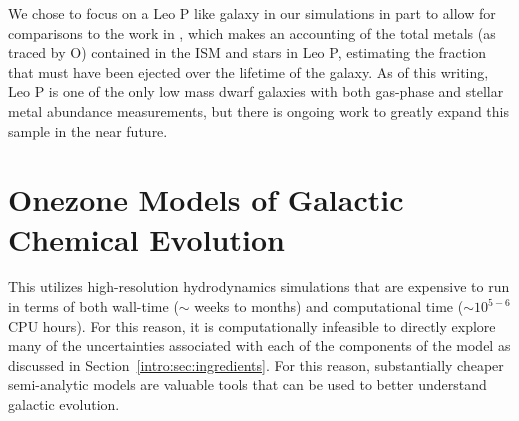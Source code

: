We chose to focus on a Leo P like galaxy in our simulations in part to allow for comparisons to the work in \cite{McQuinn2015}, which makes an accounting of the total metals (as traced by O) contained in the ISM and stars in Leo P, estimating the fraction that must have been ejected over the lifetime of the galaxy.
As of this writing, Leo P is one of the only low mass dwarf galaxies with both gas-phase and stellar metal abundance measurements, but there is ongoing work to greatly expand this sample in the near future.

\section{Onezone Models of Galactic Chemical Evolution}
\label{intro:sec:onezone}

This \dissertation utilizes high-resolution hydrodynamics simulations that are expensive to run in terms of both wall-time ($\sim$ weeks to months) and computational time ($\sim 10^{5-6}$ CPU hours). For this reason, it is computationally infeasible to directly explore many of the uncertainties associated with each of the components of the model as discussed in Section~\ref{intro:sec:ingredients}. For this reason, substantially cheaper semi-analytic models are valuable tools that can be used to better understand galactic evolution.

